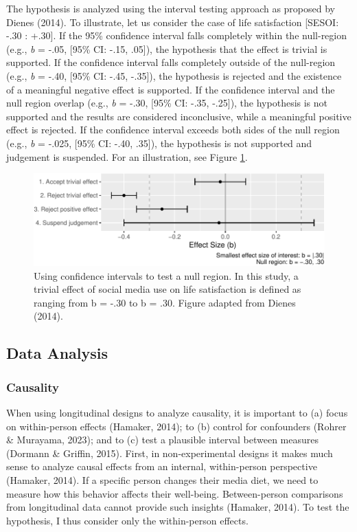\documentclass[
  man,mask,floatsintext]{apa7}
\begin{document}
The hypothesis is analyzed using the interval testing approach as proposed by Dienes (2014).
To illustrate, let us consider the case of life satisfaction {[}SESOI: -.30 : +.30{]}.
If the 95\% confidence interval falls completely within the null-region (e.g., \emph{b} = -.05, {[}95\% CI: -.15, .05{]}), the hypothesis that the effect is trivial is supported.
If the confidence interval falls completely outside of the null-region (e.g., \emph{b} = -.40, {[}95\% CI: -.45, -.35{]}), the hypothesis is rejected and the existence of a meaningful negative effect is supported.
If the confidence interval and the null region overlap (e.g., \emph{b} = -.30, {[}95\% CI: -.35, -.25{]}), the hypothesis is not supported and the results are considered inconclusive, while a meaningful positive effect is rejected.
If the confidence interval exceeds both sides of the null region (e.g., \emph{b} = -.025, {[}95\% CI: -.40, .35{]}), the hypothesis is not supported and judgement is suspended.
For an illustration, see Figure \ref{fig:sesoi}.

\begin{figure}
\centering
\includegraphics{manuscript_files/figure-latex/sesoi-1.pdf}
\caption{\label{fig:sesoi}Using confidence intervals to test a null region. In this study, a trivial effect of social media use on life satisfaction is defined as ranging from b = -.30 to b = .30. Figure adapted from Dienes (2014).}
\end{figure}

\hypertarget{data-analysis}{%
\subsection{Data Analysis}\label{data-analysis}}

\hypertarget{causality}{%
\subsubsection{Causality}\label{causality}}

When using longitudinal designs to analyze causality, it is important to (a) focus on within-person effects (Hamaker, 2014); to (b) control for confounders (Rohrer \& Murayama, 2023); and to (c) test a plausible interval between measures (Dormann \& Griffin, 2015).
First, in non-experimental designs it makes much sense to analyze causal effects from an internal, within-person perspective (Hamaker, 2014).
If a specific person changes their media diet, we need to measure how this behavior affects their well-being.
Between-person comparisons from longitudinal data cannot provide such insights (Hamaker, 2014).
To test the hypothesis, I thus consider only the within-person effects.
\end{document}
